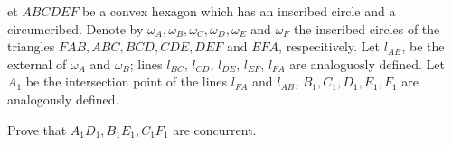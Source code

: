 et $ABCDEF$ be a convex hexagon which has an inscribed circle and a circumcribed. Denote by $\omega_{A}, \omega_{B},\omega_{C},\omega_{D},\omega_{E}$ and $\omega_{F}$ the inscribed circles of the triangles $FAB, ABC, BCD, CDE, DEF$ and $EFA$,  respecitively. Let $l_{AB}$,  be the external of $\omega_{A}$ and $\omega_{B}$; lines $l_{BC}$,  $l_{CD}$,  $l_{DE}$,  $l_{EF}$,  $l_{FA}$ are analoguosly defined. Let $A_1$ be the intersection point of the lines $l_{FA}$ and $l_{AB}$,  $B_1, C_1, D_1, E_1, F_1$ are analogously defined.

Prove that $A_1D_1, B_1E_1, C_1F_1$ are concurrent.